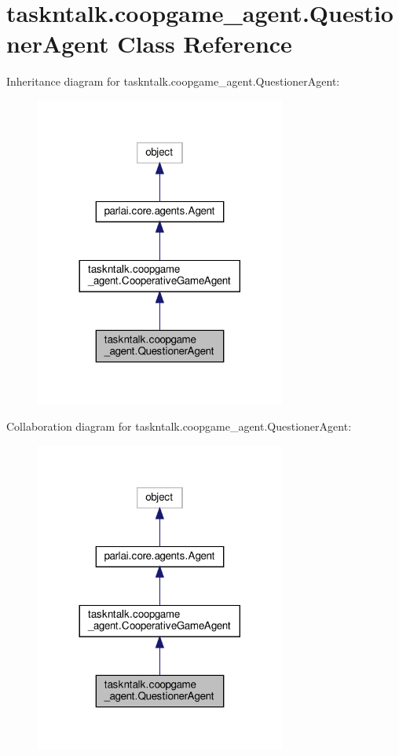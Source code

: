 \hypertarget{classtaskntalk_1_1coopgame__agent_1_1QuestionerAgent}{}\section{taskntalk.\+coopgame\+\_\+agent.\+Questioner\+Agent Class Reference}
\label{classtaskntalk_1_1coopgame__agent_1_1QuestionerAgent}


Inheritance diagram for taskntalk.\+coopgame\+\_\+agent.\+Questioner\+Agent\+:
\nopagebreak
\begin{figure}[H]
\begin{center}
\leavevmode
\includegraphics[width=233pt]{classtaskntalk_1_1coopgame__agent_1_1QuestionerAgent__inherit__graph}
\end{center}
\end{figure}


Collaboration diagram for taskntalk.\+coopgame\+\_\+agent.\+Questioner\+Agent\+:
\nopagebreak
\begin{figure}[H]
\begin{center}
\leavevmode
\includegraphics[width=233pt]{classtaskntalk_1_1coopgame__agent_1_1QuestionerAgent__coll__graph}
\end{center}
\end{figure}
